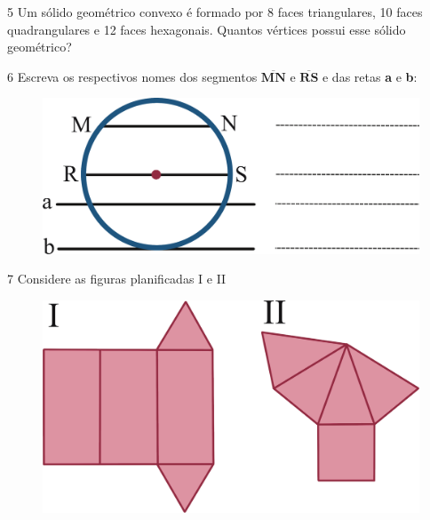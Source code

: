 \num{5} Um sólido geométrico convexo é formado por 8 faces triangulares, 10
faces quadrangulares e 12 faces hexagonais. Quantos vértices possui esse
sólido geométrico?

\begin{emptybox}
\vspace{4cm}
\end{emptybox}

\pagebreak
\num{6} Escreva os respectivos nomes dos segmentos
$\overline{\mathbf{\text{MN}}}$ e $\overline{\mathbf{\text{RS}}}$ e
das retas \textbf{a} e \textbf{b}:

\begin{figure}[htpb!]
\centering
\includegraphics[width=\textwidth]{./ilustras-mat/modulo_10-atividade_6.png}
\end{figure}


\num{7} Considere as figuras planificadas I e II

\begin{figure}[htpb!]
\centering
\includegraphics[width=\textwidth]{./ilustras-mat/modulo_10-atividade_7.png}
\end{figure}

